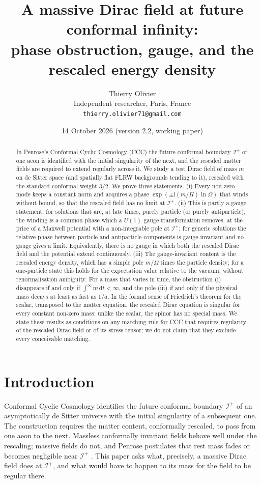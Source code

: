 \documentclass[11pt,a4paper]{article}
\title{\textbf{A massive Dirac field at future conformal infinity:\\ phase obstruction, gauge, and the rescaled energy density}}
\author{Thierry Olivier\\ \small Independent researcher, Paris, France\\ \small \texttt{thierry.olivier71@gmail.com}}
\date{14 October 2026 \quad (version 2.2, working paper)}
\theoremstyle{definition}
\newcommand{\scri}{\mathscr{I}^{+}}
\newcommand{\dd}{\mathrm{d}}
\newcommand{\ii}{\mathrm{i}}
\begin{document}
\maketitle

\begin{abstract}
In Penrose's Conformal Cyclic Cosmology (CCC) the future conformal boundary $\scri$ of one aeon is identified with the initial singularity of the next, and the rescaled matter fields are required to extend regularly across it. We study a test Dirac field of mass $m$ on de Sitter space (and spatially flat FLRW backgrounds tending to it), rescaled with the standard conformal weight $3/2$. We prove three statements. (i) Every non-zero mode keeps a constant norm and acquires a phase $\exp(\pm\ii(m/H)\ln\Omega)$ that winds without bound, so that the rescaled field has no limit at $\scri$. (ii) This is partly a gauge statement: for solutions that are, at late times, purely particle (or purely antiparticle), the winding is a common phase which a $U(1)$ gauge transformation removes, at the price of a Maxwell potential with a non-integrable pole at $\scri$; for generic solutions the relative phase between particle and antiparticle components is gauge invariant and no gauge gives a limit. Equivalently, there is no gauge in which both the rescaled Dirac field and the potential extend continuously. (iii) The gauge-invariant content is the rescaled energy density, which has a simple pole $m/\Omega$ times the particle density; for a one-particle state this holds for the expectation value relative to the vacuum, without renormalisation ambiguity. For a mass that varies in time, the obstruction (i) disappears if and only if $\int^\infty m\,\dd t<\infty$, and the pole (iii) if and only if the physical mass decays at least as fast as $1/a$. In the formal sense of Friedrich's theorem for the scalar, transposed to the matter equation, the rescaled Dirac equation is singular for every constant non-zero mass: unlike the scalar, the spinor has no special mass. We state these results as conditions on any matching rule for CCC that requires regularity of the rescaled Dirac field or of its stress tensor; we do not claim that they exclude every conceivable matching.
\end{abstract}

\section{Introduction}

Conformal Cyclic Cosmology \cite{Penrose2010,Tod2013,MeissnerPenrose2025} identifies the future conformal boundary $\scri$ of an asymptotically de Sitter universe with the initial singularity of a subsequent one. The construction requires the matter content, conformally rescaled, to pass from one aeon to the next. Massless conformally invariant fields behave well under the rescaling; massive fields do not, and Penrose postulates that rest mass fades or becomes negligible near $\scri$ \cite{Penrose2010}. This paper asks what, precisely, a massive Dirac field does at $\scri$, and what would have to happen to its mass for the field to be regular there.
\end{document}
